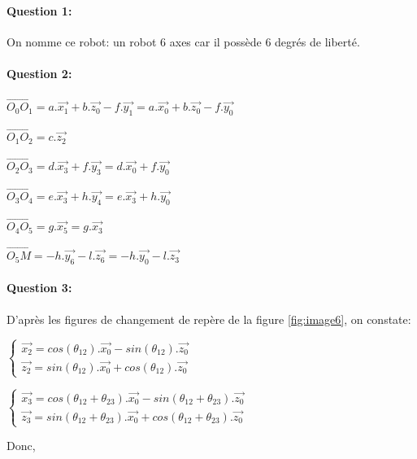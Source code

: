\paragraph{Question 1:} On nomme ce robot: \og un robot 6 axes \fg car il possède 6 degrés de liberté.

\paragraph{Question 2:}

$\overrightarrow{O_0O_1}=a.\overrightarrow{x_1}+b.\overrightarrow{z_0}-f.\overrightarrow{y_1}=a.\overrightarrow{x_0}+b.\overrightarrow{z_0}-f.\overrightarrow{y_0}$

$\overrightarrow{O_1O_2}=c.\overrightarrow{z_2}$

$\overrightarrow{O_2O_3}=d.\overrightarrow{x_3}+f.\overrightarrow{y_3}=d.\overrightarrow{x_0}+f.\overrightarrow{y_0}$

$\overrightarrow{O_3O_4}=e.\overrightarrow{x_3}+h.\overrightarrow{y_4}=e.\overrightarrow{x_3}+h.\overrightarrow{y_0}$

$\overrightarrow{O_4O_5}=g.\overrightarrow{x_5}=g.\overrightarrow{x_3}$

$\overrightarrow{O_5M}=-h.\overrightarrow{y_6}-l.\overrightarrow{z_6}=-h.\overrightarrow{y_0}-l.\overrightarrow{z_3}$

\paragraph{Question 3:} D'après les figures de changement de repère de la figure \ref{fig:image6}, on constate:

$\left\{\begin{array}{l} \overrightarrow{x_2}=cos(\theta_{12}).\overrightarrow{x_0}-sin(\theta_{12}).\overrightarrow{z_0} \\
\overrightarrow{z_2}=sin(\theta_{12}).\overrightarrow{x_0}+cos(\theta_{12}).\overrightarrow{z_0} \end{array}\right.$

$\left\{\begin{array}{l} \overrightarrow{x_3}=cos(\theta_{12}+\theta_{23}).\overrightarrow{x_0}-sin(\theta_{12}+\theta_{23}).\overrightarrow{z_0} \\
\overrightarrow{z_3}=sin(\theta_{12}+\theta_{23}).\overrightarrow{x_0}+cos(\theta_{12}+\theta_{23}).\overrightarrow{z_0} \end{array}\right.$

Donc,

